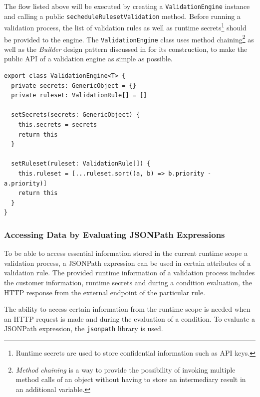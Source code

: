       The flow listed above will be executed by creating a \verb;ValidationEngine; instance and calling a public \verb;secheduleRulesetValidation; method. Before running a validation process, the list of validation rules as well as runtime secrets\footnote{Runtime secrets are used to store confidential information such as API keys.} should be provided to the engine. The \verb;ValidationEngine; class uses method chaining\footnote{\emph{Method chaining} is a way to provide the possibility of invoking multiple method calls of an object without having to store an intermediary result in an additional variable.} as well as the \emph{Builder} design pattern discussed in \autocite[pp. 97-106]{gamma-1995} for its construction, to make the public API of a validation engine as simple as possible.

      \begin{lstlisting}[style=es6, caption={ValidationEngine class builder pattern using method chaining (TypeScript)}]
export class ValidationEngine<T> {
  private secrets: GenericObject = {}
  private ruleset: ValidationRule[] = []

  setSecrets(secrets: GenericObject) {
    this.secrets = secrets
    return this
  }

  setRuleset(ruleset: ValidationRule[]) {
    this.ruleset = [...ruleset.sort((a, b) => b.priority - a.priority)]
    return this
  }
}
      \end{lstlisting}

    \subsubsection{Accessing Data by Evaluating JSONPath Expressions}
      
      To be able to access essential information stored in the current runtime scope a validation process, a JSONPath expression can be used in certain attributes of a validation rule. The provided runtime information of a validation process includes the customer information, runtime secrets and during a condition evaluation, the HTTP response from the external endpoint of the particular rule. 

      The ability to access certain information from the runtime scope is needed when an HTTP request is made and during the evaluation of a condition. To evaluate a JSONPath expression, the \verb;jsonpath; library is used. 

